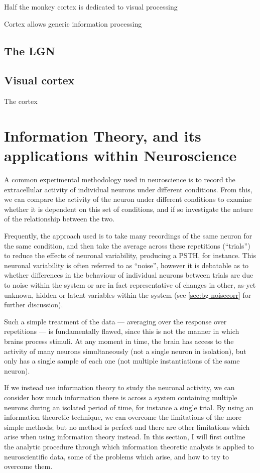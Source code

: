 Half the monkey cortex is dedicated to visual processing

Cortex allows generic information processing


\subsection{The \acl{LGN}}




\subsection{Visual cortex}

The cortex


\section{Information Theory, and its applications within Neuroscience}
\label{sec:bgit}

A common experimental methodology used in neuroscience is to record the extracellular activity of individual neurons under different conditions.
From this, we can compare the activity of the neuron under different conditions to examine whether it is dependent on this set of conditions, and if so investigate the nature of the relationship between the two.

Frequently, the approach used is to take many recordings of the same neuron for the same condition, and then take the average across these repetitions (``trials'') to reduce the effects of neuronal variability, producing a \ac{PSTH}, for instance.
This neuronal variability is often referred to as ``noise'', however it is debatable as to whether differences in the behaviour of individual neurons between trials are due to noise within the system or are in fact representative of changes in other, as-yet unknown, hidden or latent variables within the system (see \autoref{sec:bg-noisecorr} for further discussion).

Such a simple treatment of the data --- averaging over the response over repetitions --- is fundamentally flawed, since this is not the manner in which brains process stimuli.
At any moment in time, the brain has access to the activity of many neurons simultaneously (not a single neuron in isolation), but only has a single sample of each one (not multiple instantiations of the same neuron).

If we instead use information theory to study the neuronal activity, we can consider how much information there is across a system containing multiple neurons during an isolated period of time, for instance a single trial.
By using an information theoretic technique, we can overcome the limitations of the more simple methods; but no method is perfect and there are other limitations which arise when using information theory instead.
In this section, I will first outline the analytic procedure through which information theoretic analysis is applied to neuroscientific data, some of the problems which arise, and how to try to overcome them.


